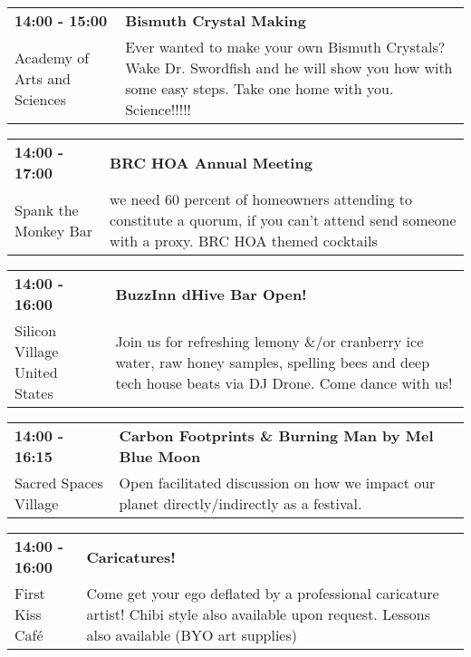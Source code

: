 \begin{tabular}{ p{1in} p{2.2in} }
    \textbf{14:00 - 15:00} & \textbf{Bismuth Crystal Making} \\
    Academy of Arts and Sciences \newline  & Ever wanted to make your own Bismuth Crystals?  Wake Dr. Swordfish and he will show you how with some easy steps. Take one home with you. Science!!!!! \\
    \hline 
\end{tabular}
    
\begin{tabular}{ p{1in} p{2.2in} }
    \textbf{14:00 - 17:00} & \textbf{BRC HOA Annual Meeting} \\
    Spank the Monkey Bar \newline  & we need 60 percent of homeowners attending to constitute a quorum, if you can't attend send someone with a proxy. BRC HOA themed cocktails \\
    \hline 
\end{tabular}
    
\begin{tabular}{ p{1in} p{2.2in} }
    \textbf{14:00 - 16:00} & \textbf{BuzzInn dHive Bar Open!} \\
    Silicon Village \newline United States & Join us for refreshing lemony \&/or cranberry ice water, raw honey samples, spelling bees and deep tech house beats via DJ Drone.  Come dance with us! \\
    \hline 
\end{tabular}
    
\begin{tabular}{ p{1in} p{2.2in} }
    \textbf{14:00 - 16:15} & \textbf{Carbon Footprints \& Burning Man by Mel Blue Moon} \\
    Sacred Spaces Village \newline  & Open facilitated discussion on how we impact our planet directly/indirectly as a festival. \\
    \hline 
\end{tabular}
    
\begin{tabular}{ p{1in} p{2.2in} }
    \textbf{14:00 - 16:00} & \textbf{Caricatures!} \\
    First Kiss Caf\'e \newline  & Come get your ego deflated by a professional caricature artist!  Chibi style also available upon request.  Lessons also available (BYO art supplies) \\
    \hline 
\end{tabular}
    
